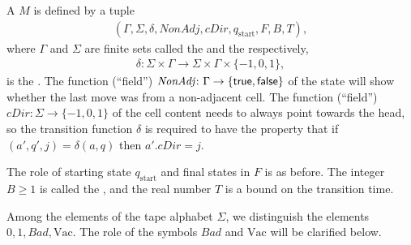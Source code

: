 \documentclass[12pt]{memoir}
\newcommand{\fld}[1]{\ensuremath{\textit{#1}}}
\def\B{B}
\newcommand{\Bad}{\mathit{Bad}}
\newcommand{\Tu}{T}
\newcommand{\cDir}{\fld{cDir}}
\newcommand{\NonAdj}{\fld{NonAdj}}
\newcommand{\start}{\mathrm{start}}
\newcommand{\Vacant}{\mathrm{Vac}}
\begin{document}
\begin{definition}\label{def:gen-TM}
    A  \( M \) is defined by a tuple
        \begin{align}\label{eq:gen-TM}
             (\Gamma, \Sigma, \delta, \NonAdj, \cDir, q_{\start},F, \B, \Tu),
       \end{align}
    where \( \Gamma \) and \( \Sigma \) are finite sets
    called the  and the  respectively,
        \begin{align*}
             \delta: \Sigma\times \Gamma
             \to \Sigma\times \Gamma\times\{-1,0,1\},
        \end{align*}
    is the .
The function (``field'') \( \NonAdj\colon\Gamma\to\{\true,\false\} \) of the 
state will show whether the last move was from a non-adjacent cell.
The function (``field'') \( \cDir\colon\Sigma\to\{-1,0,1\} \) of the cell content
needs to always point towards the head, so 
the transition function \( \delta \) is required to have the property that
if \( (a',q',j)=\delta(a,q) \) then \( a'.\cDir=j \).

The role of starting state \( q_{\start} \) and final states in \( F \) is as before.
The integer \( \B\ge 1 \) is called the ,
and the real number \( \Tu \) is a bound on the transition time.

Among the elements of the tape alphabet \( \Sigma \), 
we distinguish the elements \( 0,1,\Bad,\Vacant \).
The role of the symbols \( \Bad \) and \( \Vacant \) will be clarified below.
\end{definition}
\end{document}
